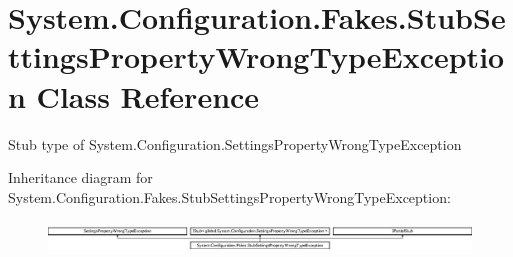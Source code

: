 \hypertarget{class_system_1_1_configuration_1_1_fakes_1_1_stub_settings_property_wrong_type_exception}{\section{System.\-Configuration.\-Fakes.\-Stub\-Settings\-Property\-Wrong\-Type\-Exception Class Reference}
\label{class_system_1_1_configuration_1_1_fakes_1_1_stub_settings_property_wrong_type_exception}
}


Stub type of System.\-Configuration.\-Settings\-Property\-Wrong\-Type\-Exception 


Inheritance diagram for System.\-Configuration.\-Fakes.\-Stub\-Settings\-Property\-Wrong\-Type\-Exception\-:\begin{figure}[H]
\begin{center}
\leavevmode
\includegraphics[height=0.835198cm]{class_system_1_1_configuration_1_1_fakes_1_1_stub_settings_property_wrong_type_exception}
\end{center}
\end{figure}
